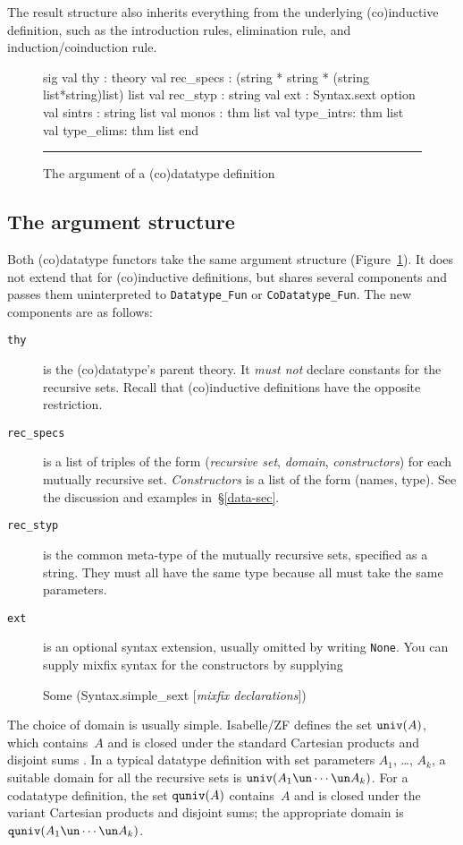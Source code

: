 The result structure also inherits everything from the underlying
(co)inductive definition, such as the introduction rules, elimination rule,
and induction/coinduction rule.


\begin{figure}
\begin{ttbox}
sig
val thy       : theory
val rec_specs : (string * string * (string list*string)list) list
val rec_styp  : string
val ext       : Syntax.sext option
val sintrs    : string list
val monos     : thm list
val type_intrs: thm list
val type_elims: thm list
end
\end{ttbox}
\hrule
\caption{The argument of a (co)datatype definition} \label{data-arg-fig}
\end{figure}

\subsection{The argument structure}
Both (co)datatype functors take the same argument structure
(Figure~\ref{data-arg-fig}).  It does not extend that for (co)inductive
definitions, but shares several components  and passes them uninterpreted to
\verb|Datatype_Fun| or
\verb|CoDatatype_Fun|.  The new components are as follows:
\begin{description}
\item[\tt thy] is the (co)datatype's parent theory. It {\it must not\/}
declare constants for the recursive sets.  Recall that (co)inductive
definitions have the opposite restriction.

\item[\tt rec\_specs] is a list of triples of the form ({\it recursive set\/},
{\it domain\/}, {\it constructors\/}) for each mutually recursive set.  {\it
Constructors\/} is a list of the form (names, type).  See the discussion and
examples in~\S\ref{data-sec}.

\item[\tt rec\_styp] is the common meta-type of the mutually recursive sets,
specified as a string.  They must all have the same type because all must
take the same parameters.

\item[\tt ext] is an optional syntax extension, usually omitted by writing
{\tt None}.  You can supply mixfix syntax for the constructors by supplying
\begin{ttbox}
Some (Syntax.simple_sext [{\it mixfix declarations\/}])
\end{ttbox}
\end{description}
The choice of domain is usually simple.  Isabelle/ZF defines the set
${\tt univ}(A)$, which contains~$A$ and is closed under the standard Cartesian
products and disjoint sums \cite[\S4.2]{paulson-set-II}.  In a typical
datatype definition with set parameters $A_1$, \ldots, $A_k$, a suitable
domain for all the recursive sets is $\univ(A_1\un\cdots\un A_k)$.  For a
codatatype definition, the set
${\tt quniv}(A)$ contains~$A$ and is closed under the variant Cartesian products
and disjoint sums; the appropriate domain is
$\quniv(A_1\un\cdots\un A_k)$.

